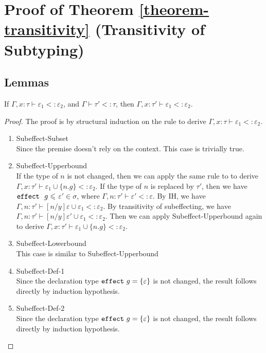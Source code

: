 \pagebreak


\appendix
\chapter{Proof of Theorem \ref{theorem-transitivity} (Transitivity of Subtyping)}
\section{Lemmas}
\begin{lemma}
If $\Gamma, x : \tau \vdash \varepsilon_1 <: \varepsilon_2$, and $\Gamma \vdash \tau' <: \tau$, then $\Gamma, x : \tau' \vdash \varepsilon_1 <: \varepsilon_2$.
\begin{proof}
The proof is by structural induction on the rule to derive $\Gamma, x : \tau \vdash \varepsilon_1 <: \varepsilon_2$. \begin{enumerate}
\item Subeffect-Subset\\
Since the premise doesn't rely on the context. This case is trivially true.
\item Subeffect-Upperbound\\
If the type of $n$ is not changed, then we can apply the same rule to to derive $\Gamma, x : \tau' \vdash \varepsilon_1 \cup \{n.g\}<: \varepsilon_2$. If the type of $n$ is replaced by $\tau'$, then we have $\mathtt{effect}~\ g \leqslant$ $\varepsilon' \in \sigma$, where $\Gamma, n: \tau' \vdash \varepsilon' <: \varepsilon$. By IH, we have $\Gamma, n : \tau' \vdash [n/y]\varepsilon \cup \varepsilon_1 <: \varepsilon_2$. By transitivity of subeffecting, we have $\Gamma, n : \tau' \vdash [n/y]\varepsilon' \cup \varepsilon_1 <: \varepsilon_2$. Then we can apply Subeffect-Upperbound again to derive $\Gamma, x : \tau' \vdash \varepsilon_1 \cup \{n.g\}<: \varepsilon_2$.
\item Subeffect-Lowerbound\\ This case is similar to Subeffect-Upperbound
\item Subeffect-Def-1\\ Since the declaration type $\mathtt{effect}~ g = \{\varepsilon\}$ is not changed, the result follows directly by induction hypothesis.
\item Subeffect-Def-2\\ Since the declaration type $\mathtt{effect}~ g = \{\varepsilon\}$ is not changed, the result follows directly by induction hypothesis.
\end{enumerate}
\end{proof}
\label{lemma-context-effect}
\end{lemma}

